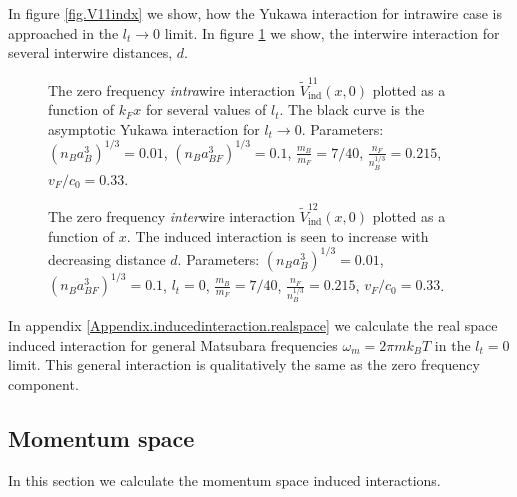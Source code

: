 In figure \ref{fig.V11indx} we show, how the Yukawa interaction for intrawire case is approached in the $l_t\to 0$ limit. In figure \ref{fig.V12indx} we show, the interwire interaction for several interwire distances, $d$. 

\begin{figure} 
\begin{center}  
  
\caption{The zero frequency \textit{intra}wire interaction $\tilde{V}^{11}_{\text{ind}}(x,0)$ plotted as a function of $k_Fx$ for several values of $l_t$. The black curve is the asymptotic Yukawa interaction for $l_t \to 0$. Parameters: $(n_Ba_B^3)^{1/3} = 0.01$, $(n_Ba_{BF}^3)^{1/3} = 0.1$, $\frac{m_B}{m_F} = 7/40$, $\frac{n_F}{n_B^{1/3}} = 0.215$, $v_F/c_0 = 0.33$.}  
\label{fig.V11indx}  
\vspace{0.5cm}
  
\caption{The zero frequency \textit{inter}wire interaction $\tilde{V}_{\text{ind}}^{12}(x,0)$ plotted as a function of $x$. The induced interaction is seen to increase with decreasing distance $d$. Parameters: $(n_Ba_B^3)^{1/3} = 0.01$, $(n_Ba_{BF}^3)^{1/3} = 0.1$, $l_t = 0$, $\frac{m_B}{m_F} = 7/40$, $\frac{n_F}{n_B^{1/3}} = 0.215$, $v_F/c_0 = 0.33$.}  
\label{fig.V12indx}  
\end{center}    
\end{figure}

In appendix \ref{Appendix.inducedinteraction.realspace} we calculate the real space induced interaction for general Matsubara frequencies $\omega_m = 2\pi m k_BT$ in the $l_t = 0$ limit. This general interaction is qualitatively the same as the zero frequency component.  

\subsection{Momentum space}
\label{subsec.inducedinteraction.momentumspace}
In this section we calculate the momentum space induced interactions.

